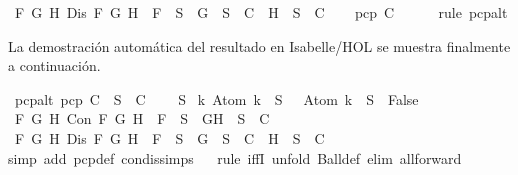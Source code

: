 \begin{isabellebody}
{\isasymand}\ {\isacharparenleft}{\isasymforall}F\ G\ H{\isachardot}\ Dis\ F\ G\ H\ {\isasymlongrightarrow}\ F\ {\isasymin}\ S\ {\isasymlongrightarrow}\ {\isacharbraceleft}G{\isacharbraceright}\ {\isasymunion}\ S\ {\isasymin}\ C\ {\isasymor}\ {\isacharbraceleft}H{\isacharbraceright}\ {\isasymunion}\ S\ {\isasymin}\ C{\isacharparenright}{\isachardoublequoteclose}\isanewline
\ \ \isamarkupfalse%
\ {\isachardoublequoteopen}pcp\ C{\isachardoublequoteclose}\isanewline
\ \ \ \ \isamarkupfalse%
\ {\isacharparenleft}rule\ pcp{\isacharunderscore}alt{}{\isacharparenright}\isanewline
{}\isamarkupfalse%
%
\endisatagproof
{\isafoldproof}%
%
\isadelimproof
%
\endisadelimproof
%
\begin{isamarkuptext}%
La demostración automática del resultado en Isabelle/HOL se muestra finalmente a 
  continuación.%
\end{isamarkuptext}\isamarkuptrue%
\isamarkupfalse%
\ pcp{\isacharunderscore}alt{\isacharcolon}\ {\isachardoublequoteopen}pcp\ C\ {\isacharequal}\ {\isacharparenleft}{\isasymforall}S\ {\isasymin}\ C{\isachardot}\isanewline
\ \ {\isasymbottom}\ {\isasymnotin}\ S\isanewline
{\isasymand}\ {\isacharparenleft}{\isasymforall}k{\isachardot}\ Atom\ k\ {\isasymin}\ S\ {\isasymlongrightarrow}\ \isactrlbold {\isasymnot}\ {\isacharparenleft}Atom\ k{\isacharparenright}\ {\isasymin}\ S\ {\isasymlongrightarrow}\ False{\isacharparenright}\isanewline
{\isasymand}\ {\isacharparenleft}{\isasymforall}F\ G\ H{\isachardot}\ Con\ F\ G\ H\ {\isasymlongrightarrow}\ F\ {\isasymin}\ S\ {\isasymlongrightarrow}\ {\isacharbraceleft}G{\isacharcomma}H{\isacharbraceright}\ {\isasymunion}\ S\ {\isasymin}\ C{\isacharparenright}\isanewline
{\isasymand}\ {\isacharparenleft}{\isasymforall}F\ G\ H{\isachardot}\ Dis\ F\ G\ H\ {\isasymlongrightarrow}\ F\ {\isasymin}\ S\ {\isasymlongrightarrow}\ {\isacharbraceleft}G{\isacharbraceright}\ {\isasymunion}\ S\ {\isasymin}\ C\ {\isasymor}\ {\isacharbraceleft}H{\isacharbraceright}\ {\isasymunion}\ S\ {\isasymin}\ C{\isacharparenright}{\isacharparenright}{\isachardoublequoteclose}\isanewline
%
\isadelimproof
\ \ %
\endisadelimproof
%
\isatagproof
{}\isamarkupfalse%
{\isacharparenleft}simp\ add{\isacharcolon}\ pcp{\isacharunderscore}def\ con{\isacharunderscore}dis{\isacharunderscore}simps{\isacharparenright}\isanewline
\ \ \isamarkupfalse%
{\isacharparenleft}rule\ iffI{\isacharsemicolon}\ unfold\ Ball{\isacharunderscore}def{\isacharsemicolon}\ elim\ all{\isacharunderscore}forward{\isacharparenright}\isanewline

\end{isabellebody}

